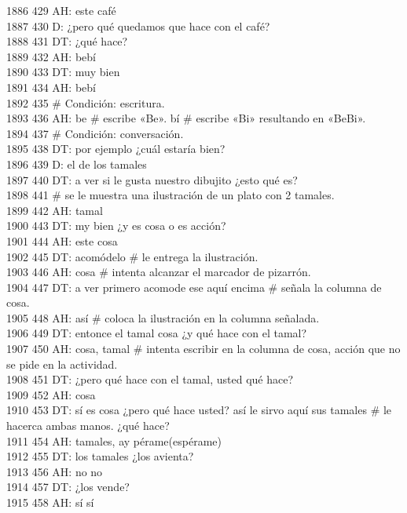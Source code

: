 1886 429 AH: este café\\
1887 430 D: ¿pero qué quedamos que hace con el café?\\
1888 431 DT: ¿qué hace?\\
1889 432 AH: bebí\\
1890 433 DT: muy bien\\
1891 434 AH: bebí\\
1892 435 # Condición: escritura.\\
1893 436 AH: be # escribe «Be». bí # escribe «Bi» resultando en «BeBi».\\
1894 437 # Condición: conversación.\\
1895 438 DT: por ejemplo ¿cuál estaría bien?\\
1896 439 D: el de los tamales\\
1897 440 DT: a ver si le gusta nuestro dibujito ¿esto qué es?\\
1898 441 # se le muestra una ilustración de un plato con 2 tamales.\\
1899 442 AH: tamal\\
1900 443 DT: my bien ¿y es cosa o es acción?\\
1901 444 AH: este cosa\\
1902 445 DT: acomódelo # le entrega la ilustración.\\
1903 446 AH: cosa # intenta alcanzar el marcador de pizarrón.\\
1904 447 DT: a ver primero acomode ese aquí encima # señala la columna de cosa.\\
1905 448 AH: así # coloca la ilustración en la columna señalada.\\
1906 449 DT: entonce el tamal cosa ¿y qué hace con el tamal?\\
1907 450 AH: cosa, tamal # intenta escribir en la columna de cosa, acción que no se pide en la actividad.\\
1908 451 DT: ¿pero qué hace con el tamal, usted qué hace?\\
1909 452 AH: cosa\\
1910 453 DT: sí es cosa ¿pero qué hace usted? así le sirvo aquí sus tamales # le hacerca ambas manos. ¿qué hace?\\
1911 454 AH: tamales, ay pérame(espérame)\\
1912 455 DT: los tamales ¿los avienta?\\
1913 456 AH: no no\\
1914 457 DT: ¿los vende?\\
1915 458 AH: sí sí\\
